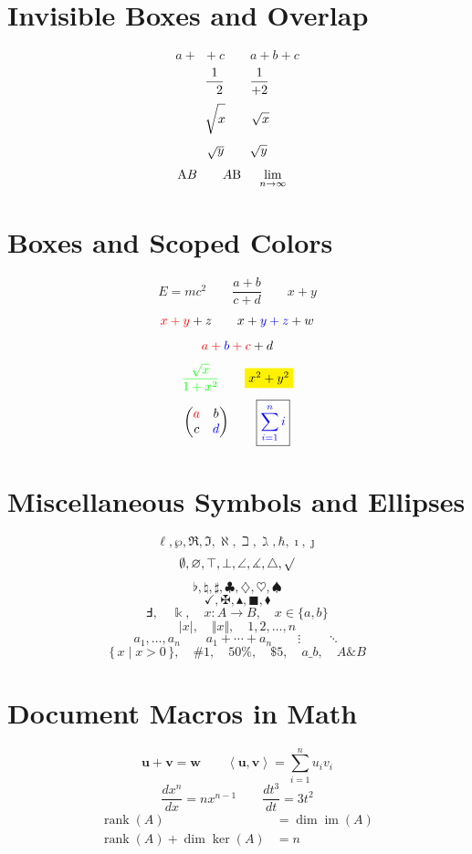 \documentclass[12pt]{article}
\newcommand{\vect}[1]{\mathbf{#1}}
\newcommand{\inner}[2]{\left\langle #1,#2\right\rangle}
\newcommand{\deriv}[2][x]{\frac{d #2}{d #1}}
\DeclareMathOperator{\rank}{rank}
\begin{document}
\section{Invisible Boxes and Overlap}

\[
a+\phantom{b}+c \qquad a+b+c
\]
\[
\frac{1}{\hphantom{+}2} \qquad \frac{1}{+2}
\]
\[
\sqrt{\vphantom{\frac{a}{b}}x} \qquad \sqrt{x}
\]
\[
\sqrt{\smash{y}} \qquad \sqrt{y}
\]
\[
\llap{A}B \qquad A\rlap{B} \qquad \mathop{\mathrm{lim}}\limits_{n\to\infty}
\]

\section{Boxes and Scoped Colors}

\[
\boxed{E=mc^2} \qquad \boxed{\frac{a+b}{c+d}}
\qquad \boxed{\boxed{x}+y}
\]
\[
\textcolor{red}{x+y}+z \qquad x+{\color{blue}y+z}+w
\]
\[
\textcolor{red}{a+\textcolor{blue}{b}+c}+d
\]
\[
\textcolor{green}{\frac{\sqrt{x}}{1+x^2}}
\qquad \colorbox{yellow}{$x^2+y^2$}
\]
\[
\begin{pmatrix}\textcolor{red}{a}&b\\c&\textcolor{blue}{d}\end{pmatrix}
\qquad \boxed{\textcolor{blue}{\sum_{i=1}^{n}i}}
\]

\section{Miscellaneous Symbols and Ellipses}

\[
\ell,\wp,\Re,\Im,\aleph,\beth,\gimel,\hbar,\imath,\jmath
\]
\[
\emptyset,\varnothing,\top,\bot,\angle,\measuredangle,\triangle,\surd
\]
\[
\flat,\natural,\sharp,\clubsuit,\diamondsuit,\heartsuit,\spadesuit
\]
\[
\checkmark,\maltese,\blacktriangle,\blacksquare,\blacklozenge
\]
\[
\Finv,\quad \Bbbk,\quad x\colon A\to B,\quad x\in\lbrace a,b\rbrace
\]
\[
\vert x\vert,\quad \Vert x\Vert,\quad 1,2,\dots,n
\]
\[
a_1,\ldots,a_n \qquad a_1+\cdots+a_n \qquad \vdots \qquad \ddots
\]
\[
\{\,x\mid x>0\,\},\quad \#1,\quad 50\%,\quad \$5,\quad a\_b,\quad A\&B
\]

\section{Document Macros in Math}

\[
\vect{u}+\vect{v}=\vect{w}
\qquad \inner{\vect{u}}{\vect{v}}=\sum_{i=1}^{n}u_i v_i
\]
\[
\deriv{x^n}=nx^{n-1} \qquad \deriv[t]{t^3}=3t^2
\]
\begin{align*}
\rank(A) &= \dim\operatorname{im}(A) \\
\rank(A)+\dim\ker(A) &= n
\end{align*}
\end{document}

